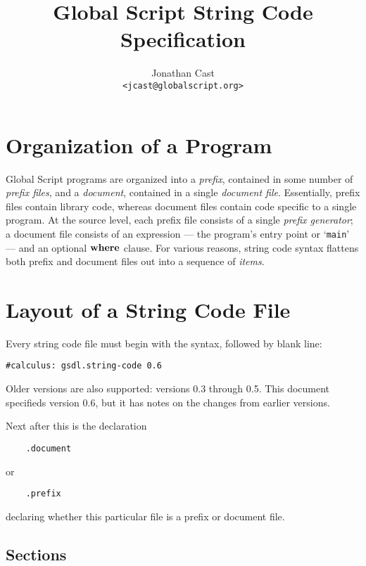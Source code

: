\documentclass{report}
\title{Global Script String Code Specification}
\author{Jonathan Cast\\\texttt{<jcast@globalscript.org>}}
\newcommand\ccode[1]{\texttt{#1}}
\begin{document}
\maketitle

\tableofcontents

\chapter{Organization of a Program}

Global Script programs are organized into a \emph{prefix},
contained in some number of \emph{prefix files},
 and a \emph{document}, contained in a single \emph{document file}.
Essentially, prefix files contain library code, whereas document files contain code specific to a single program.
At the source level, each prefix file consists of a single \emph{prefix generator};
a document file consists of an expression
--- the program's entry point or `\ccode{main}' ---
and an optional $\mathbf{where}$ clause.
For various reasons, string code syntax flattens both prefix and document files out into a sequence of \emph{items}.

\chapter{Layout of a String Code File}

Every string code file must begin with the syntax, followed by  blank line:
\begin{verbatim}
#calculus: gsdl.string-code 0.6
\end{verbatim}
Older versions are also supported: versions 0.3 through 0.5.
This document specifieds version 0.6, but it has notes on the changes from earlier versions.

Next after this is the declaration
\begin{verbatim}
	.document
\end{verbatim}
or
\begin{verbatim}
	.prefix
\end{verbatim}
declaring whether this particular file is a prefix or document file.

\section{Sections}
\end{document}
